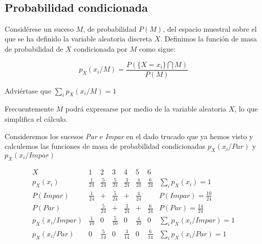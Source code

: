 \documentclass[11pt]{article}
\begin{document}
    \begin{center}
    \end{center}
    { \hspace*{\fill} \\}
    
    \hypertarget{probabilidad-condicionada}{%
\subsection*{Probabilidad condicionada}\label{probabilidad-condicionada}}

Considérese un suceso \(M\), de probabilidad \(P(M)\), del espacio
muestral sobre el que se ha definido la variable aleatoria discreta
\(X\). Definimos la función de masa de probabilidad de \(X\)
condicionada por \(M\) como sigue:

\[p_X(x_i/M) = \frac{P(\{X=x_i\}\bigcap M)}{P(M)} \]

Adviértase que \(\sum_i p_X(x_i/M) =1\)

Frecuentemente \(M\) podrá expresarse por medio de la variable aleatoria
\(X\), lo que simplifica el cálculo.

    Consideremos los sucesos \emph{Par} e \emph{Impar} en el dado trucado
que ya hemos visto y calculemos las funciones de masa de probabilidad
condicionadas \(p_X(x_i/Par)\) y \(p_X(x_i/Impar)\)

\[
\begin{array}{c|cccccc|c}
  X & 1 & 2 & 3 & 4 & 5 & 6 &  \\ 
  \hline
  p_X(x_i) & \frac{1}{24} & \frac{5}{24} & \frac{5}{24} & \frac{3}{24} & \frac{4}{24} & \frac{6}{24} & \sum_i p_X(x_i)=1 \\
  \hline
  P(Impar) & \frac{1}{24} & + & \frac{5}{24} & + & \frac{4}{24} &  & P(Impar) = \frac{10}{24} \\
  P(Par)  &  & \frac{5}{24} & + & \frac{3}{24} & + & \frac{6}{24} & P(Par) = \frac{14}{24}\\
  \hline
  p_X(x_i/Impar) & \frac{1}{10} & 0 & \frac{5}{10} & 0 & \frac{4}{10} & 0 & \sum_i p_X(x_i/Impar)=1 \\
  p_X(x_i/Par) & 0 & \frac{5}{14} & 0 & \frac{3}{14} & 0 & \frac{6}{14} & \sum_i p_X(x_i/Par)=1
 \end{array}
\]

    \begin{center}
    \end{center}
    { \hspace*{\fill} \\}
    
\end{document}
